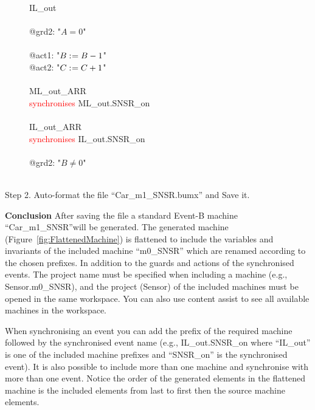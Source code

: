 \begin{description}
\begin{center}
\begin{Bcode}
			\Btab \Brefines{} IL_out\\
			\Btab \Bwhen\\
			\Btab \Btab @grd2: "\(A = 0\)"\\
			\Btab \Bthen\\
			\Btab \Btab @act1: "\(B \mathrel{:\mkern1mu=} B - 1\)"\\
			\Btab \Btab @act2: "\(C \mathrel{:\mkern1mu=} C + 1\)"\\
			\Btab \Bend\\
			\Btab ML_out_ARR\\
			\Btab \textcolor{red}{synchronises} ML_out.SNSR_on\\
			\Btab \Bend\\
			\Btab IL_out_ARR\\
			\Btab \textcolor{red}{synchronises} IL_out.SNSR_on\\
			\Btab \Bwhen\\
			\Btab \Btab @grd2: "\(B \neq 0\)"\\
			\Btab \Bend\\
			\Bend
			\fi
		\end{Bcode}
	\end{center}
	\item[Step 2. Auto-format the file ``Car\_m1\_SNSR.bumx'' and Save it.]
\end{description}
\textbf{Conclusion} After saving the file a standard Event-B machine ``Car\_m1\_SNSR''will be generated. The generated machine (Figure~\ref{fig:FlattenedMachine}) is flattened to include the variables and invariants  of the included machine ``m0\_SNSR'' which are renamed according to the chosen prefixes. In addition to the guards and actions of the synchronised events. The project name must be specified when including a machine (e.g., Sensor.m0\_SNSR), and the project (Sensor) of the included machines must be opened in the same workspace. You can also use content assist to see all available machines in the workspace.

When synchronising an event you can add the prefix of the required machine followed by the synchronised event name (e.g., IL\_out.SNSR\_on where ``IL\_out'' is one of the included machine prefixes and ``SNSR\_on'' is the synchronised event). It is also possible to include more than one machine and synchronise with more than one event. Notice the order of the generated elements in the flattened machine is the included elements from last to first then the source machine elements.

